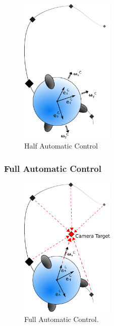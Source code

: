 \begin{figure}[H] %
	\begin{center}
		\includegraphics[width=0.4\textwidth]{HAC.pdf}
		\caption[Half automatic control]{Half Automatic Control}  
		\label{fig:half_automatic_control}		
	\end{center}
\end{figure}

\subsubsection{Full Automatic Control}
\begin{figure}[H] %
	\begin{center}
		\includegraphics[width=0.4\textwidth]{FAComega.pdf}
		\caption[Full automatic control]{Full Automatic Control.}  
		\label{fig:full_automatic_control}		
	\end{center}
\end{figure}